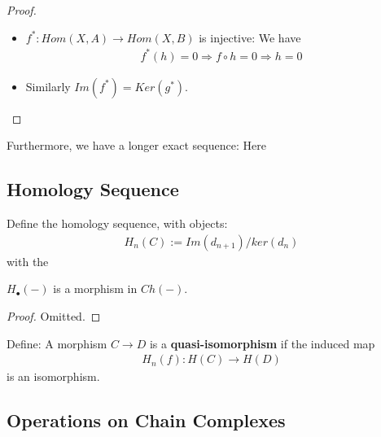 \documentclass[Total.tex]{subfiles}
\begin{document}
				\begin{proof}
					\begin{itemize}
						\item $f^*:Hom(X,A)\rightarrow Hom(X,B)$ is injective: We have
						\begin{gather*}
							f^*(h)=0\Rightarrow f\circ h=0\Rightarrow h=0
						\end{gather*}
						\item Similarly $Im(f^*)=Ker(g^*)$.
					\end{itemize}
				\end{proof}
				Furthermore, we have a longer exact sequence: Here
				\subsection{Homology Sequence}
					\begin{Def}
						Define the homology sequence, with objects:
						\begin{gather*}
							H_n(C):=Im(d_{n+1})/ker(d_n)
						\end{gather*}
						with the 
					\end{Def}
					\begin{proposition}
						$H_\bullet(-)$ is a morphism in $Ch(-)$.
					\end{proposition}
					\begin{proof}
						Omitted.
					\end{proof}
					\begin{Def}
						Define: A morphism $C\rightarrow D$ is a \textbf{quasi-isomorphism} if the induced map
						\begin{gather*}
							H_n(f):H(C)\rightarrow H(D)
						\end{gather*}
						is an isomorphism.
					\end{Def}
				\subsection{Operations on Chain Complexes}
\end{document}
